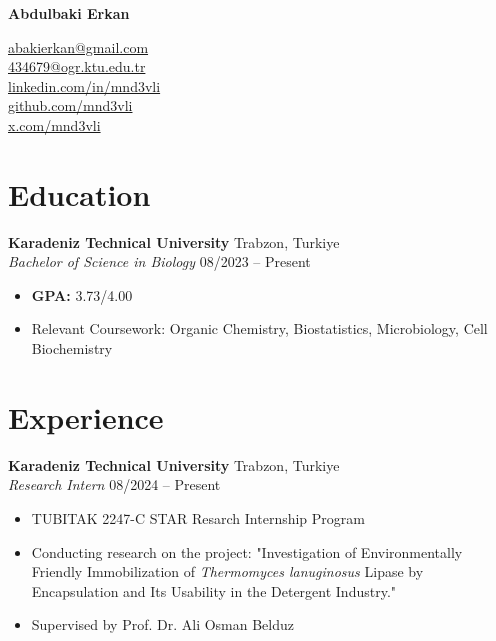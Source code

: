 \documentclass[a4paper,10pt]{article}
\begin{document}
\begin{flushleft}
    \textbf{\Huge Abdulbaki Erkan}
\end{flushleft}

\begin{flushright}
    \href{mailto:abakierkan@gmail.com}{abakierkan@gmail.com} \\
    \href{mailto:434679@ogr.ktu.edu.tr}{434679@ogr.ktu.edu.tr} \\
    \href{https://www.linkedin.com/in/mnd3vli}{linkedin.com/in/mnd3vli} \\ 
    \href{https://github.com/mnd3vli}{github.com/mnd3vli} \\
    \href{https://x.com/mnd3vli}{x.com/mnd3vli} \\
\end{flushright}

\vspace{1em}

\section*{Education}
\noindent \textbf{Karadeniz Technical University} \hfill Trabzon, Turkiye \\
\textit{Bachelor of Science in Biology} \hfill 08/2023 -- Present
\begin{itemize}[left=0pt]
    \item \textbf{GPA:} 3.73/4.00
    \item Relevant Coursework: Organic Chemistry, Biostatistics, Microbiology, Cell Biochemistry
\end{itemize}

\vspace{0.5em}

\section*{Experience}
\noindent \textbf{Karadeniz Technical University} \hfill Trabzon, Turkiye \\
\textit{Research Intern} \hfill 08/2024 -- Present \\
\begin{itemize}[left=0pt]
    \item TUBITAK 2247-C STAR Resarch Internship Program
    \item Conducting research on the project: "Investigation of Environmentally Friendly Immobilization of \textit{Thermomyces lanuginosus} Lipase by Encapsulation and Its Usability in the Detergent Industry."
    \item Supervised by Prof. Dr. Ali Osman Belduz
\end{itemize}
\end{document}
